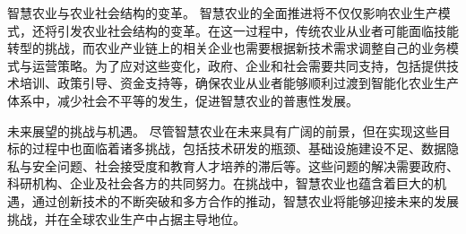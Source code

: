 智慧农业与农业社会结构的变革。  
智慧农业的全面推进将不仅仅影响农业生产模式，还将引发农业社会结构的变革。在这一过程中，传统农业从业者可能面临技能转型的挑战，而农业产业链上的相关企业也需要根据新技术需求调整自己的业务模式与运营策略。为了应对这些变化，政府、企业和社会需要共同支持，包括提供技术培训、政策引导、资金支持等，确保农业从业者能够顺利过渡到智能化农业生产体系中，减少社会不平等的发生，促进智慧农业的普惠性发展。  

未来展望的挑战与机遇。
尽管智慧农业在未来具有广阔的前景，但在实现这些目标的过程中也面临着诸多挑战，包括技术研发的瓶颈、基础设施建设不足、数据隐私与安全问题、社会接受度和教育人才培养的滞后等。这些问题的解决需要政府、科研机构、企业及社会各方的共同努力。在挑战中，智慧农业也蕴含着巨大的机遇，通过创新技术的不断突破和多方合作的推动，智慧农业将能够迎接未来的发展挑战，并在全球农业生产中占据主导地位。


